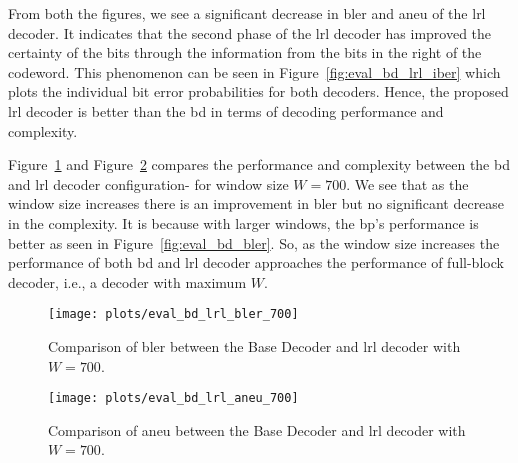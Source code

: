 From both the figures, we see a significant decrease in \gls{bler} and \gls{aneu} of the \gls{lrl} decoder. It indicates that the second phase of the \gls{lrl} decoder has improved the certainty of the bits through the information from the bits in the right of the codeword. This phenomenon can be seen in Figure~\ref{fig:eval_bd_lrl_iber} which plots the individual bit error probabilities for both decoders. Hence, the proposed \gls{lrl} decoder is better than the \gls{bd} in terms of decoding performance and complexity.

Figure~\ref{fig:eval_bd_lrl_bler_700} and Figure~\ref{fig:eval_bd_lrl_aneu_700} compares the performance and complexity between the \gls{bd} and \gls{lrl} decoder configuration- for window size $W=700$. We see that as the window size increases there is an improvement in \gls{bler} but no significant decrease in the complexity. It is because with larger windows, the \gls{bp}'s performance is better as seen in Figure~\ref{fig:eval_bd_bler}. So, as the window size increases the performance of both \gls{bd} and \gls{lrl} decoder approaches the performance of full-block decoder, i.e., a decoder with maximum $W$.
\begin{figure}[htbp]
  \centering
  \texttt{[image: plots/eval\_bd\_lrl\_bler\_700]}
  \caption{Comparison of \gls{bler} between the Base Decoder and \gls{lrl} decoder with $W=700$.}
  \label{fig:eval_bd_lrl_bler_700}
\end{figure}
\begin{figure}[htbp]
  \centering
  \texttt{[image: plots/eval\_bd\_lrl\_aneu\_700]}
  \caption{Comparison of \gls{aneu} between the Base Decoder and \gls{lrl} decoder with $W=700$.}
  \label{fig:eval_bd_lrl_aneu_700}
\end{figure}

